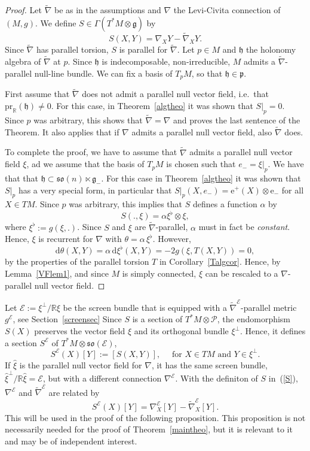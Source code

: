 \documentclass[11pt,a4paper]{amsart}
\newcommand{\p}{\mathfrak{p}}
\newcommand{\tnab}{\widetilde{\nabla}}
\newcommand{\g}{\mathfrak{g}}
\newcommand{\h}{\mathfrak{h}}
\newcommand{\+}{\oplus}
\newcommand{\so}{\mathfrak{so}}
\newcommand{\1}{\mathbf{1}}
\newcommand{\e}{\mathrm{e}}
\renewcommand{\d}{\mathrm{d}}
\newcommand{\R}{\mathbb{R}} %
\newcommand{\E}{\mathcal{E}}
\newcommand{\gE}{g^{\mathcal{E}}}
\newcommand{\tnabE}{\tnab^{\mathcal{E}}}
\newcommand{\nabE}{\nabla^{\mathcal{E}}}
\newcommand{\<}{\langle}
\renewcommand{\>}{\rangle}
\theoremstyle{definition}
\theoremstyle{plain}
\numberwithin{equation}{section}
\begin{document}
\begin{proof}
Let $\tnab$ be as in the assumptions and $\nabla$ the Levi-Civita connection of $(M,g)$.
We define  $S\in \Gamma(T^*M\otimes \g)$  by
\begin{equation}\label{S}S(X,Y)=\nabla_XY-\tnab_XY.\end{equation}
Since $\tnab$ has parallel torsion, $S$ is parallel for $\tnab$. 
Let $p\in M$ and $\h$ the holonomy algebra of $\tnab$ at $p$. Since $\h$ is indecomposable, non-irreducible, $M$ admits a $\tnab$-parallel null-line bundle. We can fix a basis of $T_pM$, so that $\h\in \p$. 

First assume that $\tnab$ does not admit a parallel null vector field, i.e.~that $\mathrm{pr}_{\R}(\h)\not=0$. For this case, in Theorem~\ref{algtheo} it was shown that $S|_p=0$. Since $p$ was arbitrary, this shows that $\tnab=\nabla$ and proves the last sentence of the Theorem.
It also applies that if $\nabla$ admits a parallel null vector field, also $\tnab $ does. 

To complete the proof, we have to assume that $\tnab$ admits a parallel null vector field $\xi$, ad we assume that the basis of $T_pM$ is chosen such that $e_-=\xi|_p$. We have that that $\h\subset \so(n)\ltimes \g_-$. For this case in Theorem~\ref{algtheo} it was shown that $S|_p$ has a very special form, in particular that $S|_p(X,e_-)=\e^+(X)\otimes \e_-$ for all $X\in TM$. Since $p$ was arbitrary, this implies 
that $S$ defines a function $\alpha$ by 
\begin{equation}\label{sxi} S(.,\xi)=\alpha \xi^\flat \otimes \xi,\end{equation}
where $\xi^\flat:=g(\xi,.)$.
Since $S$ and $\xi$  are $\tnab$-parallel,  $\alpha$ must in fact be {\em constant}.
Hence, $\xi$ is recurrent for $\nabla$ with $\theta=\alpha\,\xi^\flat$. However, 
\[\d\theta(X,Y)=\alpha\, \d \xi^\flat (X,Y)=-2 g(\xi, T(X,Y))=0,\]
by the  properties of the parallel torsion $T$ in Corollary~\ref{Talgcor}. Hence, by Lemma~\ref{VFlem1}, and since $M$ is simply connected, $\xi$ can be rescaled to a $\nabla$-parallel null vector field.
\end{proof}



Let   $\E:=\xi^\perp/\R\xi$   be  the screen bundle that is equipped with a $\tnabE$-parallel metric $\gE$, see Section~\ref{screensec}
Since $S$ is a section of $T^*M\otimes \mathcal P$, the endomorphism $S(X)$ preserves the vector field $\xi$ and its orthogonal bundle $\xi^\perp$. Hence,  it defines a section $S^{\E}$ of $T^*M\otimes \so(\E)$,
\[ S^{\E}(X)[Y]:=\left[ S(X,Y)\right],\quad \text{ for $X\in TM$ and $Y\in \xi^\perp$.} \]
If $\hat \xi$ is the parallel null vector field for $\nabla$, it has the same screen bundle, $\hat\xi^\perp/\R\hat\xi=\E$, but with a different connection $\nabE$.
With the definiton of $S$ in~(\ref{S}), $\nabE$ and $\tnabE$ are related by
\begin{equation}\label{SE}
S^\E(X)[Y]=\nabla^\E_X[Y]-\tnabE_X[Y].\end{equation}
This will be used in the proof of the following proposition. This proposition is not necessarily  needed for the proof of Theorem~\ref{maintheo}, 
but it is relevant to it and may be of independent interest.
\end{document}
